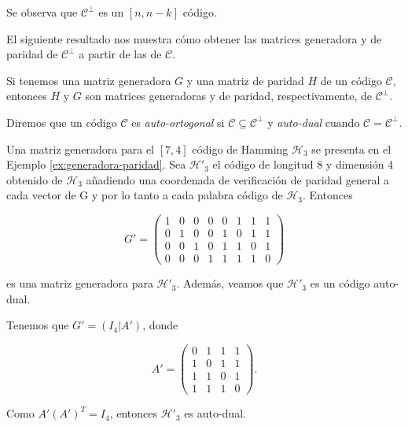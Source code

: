 Se observa que $\mathcal{C} ^{\perp}$ es un $[n,n-k]$ código.

El siguiente resultado nos muestra cómo obtener las matrices generadora y de paridad de $\mathcal{C} ^{\perp}$ a partir de las de $\mathcal{C}$.

\begin{proposition}
    Si tenemos una matriz generadora $G$ y una matriz de paridad $H$ de un código $\mathcal{C}$, entonces $H$ y $G$ son matrices generadoras y de paridad, respectivamente, de $\mathcal{C} ^{\perp}$.
\end{proposition}

Diremos que un código $\mathcal{C}$ es \emph{auto-ortogonal} si $\mathcal{C} \subseteq \mathcal{C} ^{\perp}$ y \emph{auto-dual} cuando $\mathcal{C} = \mathcal{C} ^{\perp}$.

\begin{exampleth}
    Una matriz generadora para el $[7, 4]$ código de Hamming $\mathcal{H}_3$ se presenta en el Ejemplo \ref{ex:generadora-paridad}. Sea $\mathcal{H'}_3$ el código de longitud 8 y dimensión 4 obtenido de $\mathcal{H}_3$ añadiendo una coordenada de verificación de paridad general a cada vector de G y por lo tanto a cada palabra código de $\mathcal{H}_3$. Entonces 

    \[
        G' = \left( 
        \begin{array}{cccc|cccc}  
            1 & 0 & 0 & 0 & 0 & 1 & 1 & 1 \\
            0 & 1 & 0 & 0 & 1 & 0 & 1 & 1\\
            0 & 0 & 1 & 0 & 1 & 1 & 0 & 1\\
            0 & 0 & 0 & 1 & 1 & 1 & 1 & 0
        \end{array} 
        \right)
    \]

    es una matriz generadora para $\mathcal{H'}_3$. Además, veamos que $\mathcal{H'}_3$ es un código auto-dual.

    Tenemos que $G' = (I_4 | A')$, donde

    \[
        A' = \left( 
        \begin{array}{cccc}  
            0 & 1 & 1 & 1 \\
            1 & 0 & 1 & 1\\
            1 & 1 & 0 & 1\\
            1 & 1 & 1 & 0
        \end{array} 
        \right) .
    \]

    Como $A' (A')^T = I_4$, entonces $\mathcal{H'}_3$ es auto-dual.
\end{exampleth}

